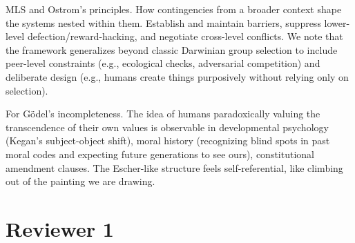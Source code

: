 \documentclass[fontsize=11.5pt]{scrartcl}
\newcounter{point}
\newcommand{\pointprefix}{}
\newcommand{\reviewersection}[2]{\section*{#1}\renewcommand{\pointprefix}{#2}\setcounter{point}{0}}
\begin{document}
MLS and Ostrom's principles. How contingencies from a broader context shape the systems nested within them. Establish and maintain barriers, suppress lower-level defection/reward-hacking, and negotiate cross-level conflicts. We note that the framework generalizes beyond classic Darwinian group selection to include peer-level constraints (e.g., ecological checks, adversarial competition) and deliberate design (e.g., humans create things purposively without relying only on selection).

For Gödel's incompleteness. The idea of humans paradoxically valuing the transcendence of their own values is observable in developmental psychology (Kegan's subject-object shift), moral history (recognizing blind spots in past moral codes and expecting future generations to see ours), constitutional amendment clauses. The Escher-like structure feels self-referential, like climbing out of the painting we are drawing. 




\reviewersection{Reviewer 1}{R1}
\end{document}
